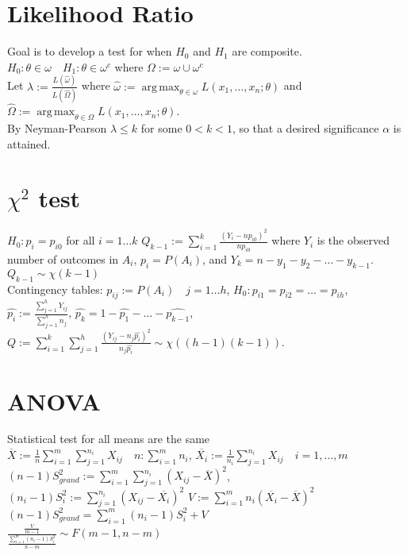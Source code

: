 \documentclass[10pt]{article}
\DeclareMathOperator*{\argmax}{arg\,max}
\begin{document}
\section{Likelihood Ratio}
Goal is to develop a test for when $H_0$ and $H_1$ are composite.\\
$H_0:\theta\in \omega\quad H_1:\theta\in\omega^c$ where $\Omega:=\omega\cup\omega^c$\\
Let $\lambda:=\frac{L(\hat{\omega})}{L(\hat{\Omega})}$ where $\hat{\omega}:=\argmax_{\theta\in\omega}L(x_1,\ldots,x_n;\theta)$ and $\hat{\Omega}:=\argmax_{\theta\in\Omega}L(x_1,\ldots,x_n;\theta)$.\\
By Neyman-Pearson $\lambda\le k$ for some $0<k<1$, so that a desired significance $\alpha$ is attained.
\section{$\chi^2$ test}
$H_0:p_i=p_{i0}$ for all $i=1\ldots k$
$Q_{k-1}:=\sum_{i=1}^{k}\frac{{(Y_i-np_{i0})}^2}{np_{i0}}$ where $Y_i$ is the observed number of outcomes in $A_i$, $p_i=P(A_i)$, and $Y_k=n-y_1-y_2-\ldots-y_{k-1}$.\\
$Q_{k-1}\sim\chi(k-1)$\\
Contingency tables:
$p_{ij}:=P(A_i)\quad j=1\ldots h$,
$H_0:p_{i1}=p_{i2}=\ldots=p_{ih}$,
$\hat{p_i}:=\frac{\sum_{j=1}^{h}Y_{ij}}{\sum_{j=1}^{h}n_{j}}$, $\hat{p_k}=1-\hat{p_1}-\ldots-\hat{p_{k-1}}$, $Q:=\sum_{i=1}^{k}\sum_{j=1}^{h}\frac{{(Y_{ij}-n_j\hat{p_i})}^2}{n_j\hat{p_i}}\sim\chi((h-1)(k-1))$.
\section{ANOVA}
Statistical test for all means are the same\\ 
$\overline{X}:=\frac{1}{n}\sum_{i=1}^{m}\sum_{j=1}^{n_i}X_{ij}\quad n:\sum_{i=1}^{m}n_i$, $\overline{X_i}:=\frac{1}{n_i}\sum_{j=1}^{n_i}X_{ij}\quad i=1,\ldots,m$\\
$(n-1)S^2_{grand}:=\sum_{i=1}^{m}\sum_{j=1}^{n_i}{(X_{ij}-\overline{X})}^2$,
$(n_i-1)S^2_{i}:=\sum_{j=1}^{n_i}{(X_{ij}-\overline{X_i})}^2$
$V:=\sum_{i=1}^{m}n_i{(\overline{X_i}-\overline{X})}^2$\\
$(n-1)S^2_{grand}=\sum_{i=1}^{m}(n_i-1)S^2_{i}+V$\\
$\frac{\frac{V}{m-1}}{\frac{\sum_{i=1}^{m}(n_i-1)S^2_{i}}{n-m}}\sim F(m-1,n-m)$
\end{document}
